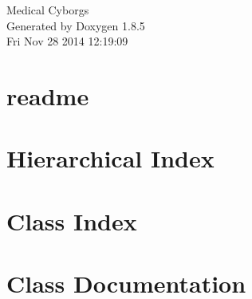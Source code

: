 \documentclass[twoside]{book}
\newcommand{\clearemptydoublepage}{%
  \newpage{\pagestyle{empty}\cleardoublepage}%
}
\begin{document}
\hypersetup{pageanchor=false}
\begin{titlepage}
\vspace*{7cm}
\begin{center}%
{\Large Medical Cyborgs }\\
\vspace*{1cm}
{\large Generated by Doxygen 1.8.5}\\
\vspace*{0.5cm}
{\small Fri Nov 28 2014 12:19:09}\\
\end{center}
\end{titlepage}
\clearemptydoublepage
\tableofcontents
\clearemptydoublepage
{}
\hypersetup{pageanchor=true}

\chapter{readme}
\label{md___users_douglas__documents_software__senior__project_ios__medical__cyborgs__medical__cyborgs_readme}
\hypertarget{md___users_douglas__documents_software__senior__project_ios__medical__cyborgs__medical__cyborgs_readme}{}

\chapter{Hierarchical Index}

\chapter{Class Index}

\chapter{Class Documentation}

































\newpage
{}
{}
\printindex
\end{document}
